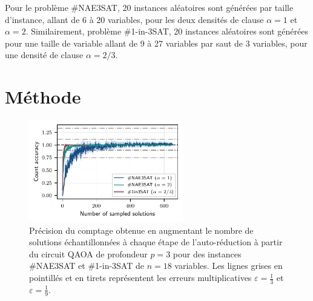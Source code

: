 Pour le problème \#NAE3SAT, 20 instances aléatoires sont générées par taille d'instance, allant de 6 à 20 variables, pour les deux densités de clause $\alpha=1$ et $\alpha = 2$. Similairement, problème \#1-in-3SAT, 20 instances aléatoires sont générées pour une taille de variable allant de 9 à 27 variables par saut de 3 variables, pour une densité de clause $\alpha = 2/3$. 


\section{Méthode}
\label{sec:methode}

\begin{figure}[H]
    \centering
    \includegraphics[width=0.6\textwidth]{figures/count-accuracy.pdf}
    \caption[Précision du comptage pour des problèmes \textsf{\#P}-difficile]{Précision du comptage obtenue en augmentant le nombre de solutions échantillonnées à chaque étape de l'auto-réduction à partir du circuit QAOA de profondeur $p=3$ pour des instances \#NAE3SAT et \#1-in-3SAT de $n=18$ variables. Les lignes grises en pointillés et en tirets représentent les erreurs multiplicatives $\varepsilon = \frac{1}{3}$ et $\varepsilon = \frac{1}{9}$.}
    \label{fig:count-accuracy.pdf}
\end{figure}

